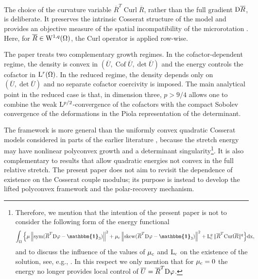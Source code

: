 \documentclass[11pt]{article}
\newcommand{\id}{{\boldsymbol{\mathbbm{1}}}}
\newcommand{\sym}{{\rm sym}}
\newcommand{\skw}{{\rm skew}}
\newcommand{\Curl}{{\rm Curl}}
\def\dd{\displaystyle}
\def\dd{\displaystyle}
\def\dd{\displaystyle}
\def\dd{\displaystyle}
\renewcommand{\dd}{\displaystyle}
\begin{document}
The choice of the curvature variable $ \overline R^{T}\operatorname{Curl}\overline R$, rather than the full gradient ${\rm D} \overline R$, is deliberate. It preserves the intrinsic Cosserat structure of the model and provides an objective measure of the spatial incompatibility of the microrotation \cite{LankeitNeffOsterbrink2017}. Here, for $\overline R\in {\rm W}^{1,q}(\Omega)$, the Curl operator is applied row-wise. 

The paper treats two complementary growth regimes. In the cofactor-dependent regime, the density is convex in $(  \overline U ,\operatorname{Cof}  \overline U ,\det  \overline U )$ and the energy controls the cofactor in ${\rm L}^r(\Omega)$. In the reduced regime, the density depends only on $(  \overline U ,\det  \overline U )$ and no separate cofactor coercivity is imposed. The main analytical point in the reduced case is that, in dimension three, $p>9/4$ allows one to combine the weak ${\rm L}^{p/2}$-convergence of the cofactors with the compact Sobolev convergence of the deformations in the Piola representation of the determinant.

The framework is more general than the uniformly convex quadratic Cosserat models considered in parts of the earlier literature \cite{Neff_Habil04,NeffBirsan13,Neff_plate04_cmt,Neff_Chelminski_ifb07}, because the stretch energy may have nonlinear polyconvex growth and a determinant singularity\footnote{Therefore, we mention that  the intention of the present paper is not to consider the following form of the energy functional \cite{Neff_Habil04}	\begin{align}
		\dd\int_{\Omega }\Big\{&
       \mu 
        \left\|\sym(
       \overline{R}^T{\rm D}\varphi
        -
        \id_3)
        \right\|^2+ \mu_{\rm c}
        \left\|\skw(
       \overline{R}^T{\rm D}\varphi
        -
        \id_3)
        \right\|^2
        +{\rm L}_{\rm c}^q \,\|\overline R^T\Curl \overline R\|^q        \Big\}{\rm d}{\rm x},\notag	\end{align}
and to  discuss the influence of the values of $\mu_{\rm c}$ and ${\rm L}_{\rm c}$ on the existence of the solution, see, e.g., \cite{Neff_Habil04,NeffBirsan13,Neff_plate04_cmt,Neff_Chelminski_ifb07}. In this respect we only mention that for $\mu_{\rm c}=0$ the energy no longer provides local control of $\overline{U}= \overline{R}^T{\rm D}\varphi$.}. It is also complementary to results that allow quadratic energies not convex in the full relative stretch. The present paper does not aim to revisit the dependence of existence on the Cosserat couple modulus; its purpose is instead to develop the lifted polyconvex framework and the polar-recovery mechanism.
\end{document}

